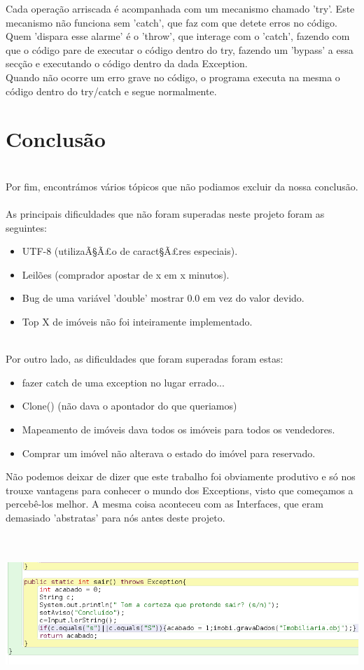 \documentclass[12pt]{article}
\begin{document}
Cada operação arriscada é acompanhada com um mecanismo chamado 'try'. Este mecanismo não funciona sem 'catch', que faz com que detete erros no código. Quem 'dispara esse alarme' é o 'throw', que interage com o 'catch', fazendo com que o código pare de executar o código dentro do try, fazendo um 'bypass' a essa secção e executando o código dentro da dada Exception. 
~\\

Quando não ocorre um erro grave no código, o programa executa na mesma o código dentro do try/catch e segue normalmente.  

\pagebreak

 
\section{Conclusão}
~\\

Por fim, encontrámos vários tópicos que não podiamos excluir da nossa conclusão.
~\\
As principais dificuldades que não foram superadas neste projeto foram as seguintes:
\begin{itemize}
\item UTF-8 (utilizaÃ§Ã£o de caract§Ã£res especiais).
\item Leilões (comprador apostar de x em x minutos).
\item Bug de uma variável 'double'  mostrar 0.0 em vez do valor devido.
\item Top X de imóveis não foi inteiramente implementado.
\end{itemize}
~\\
Por outro lado, as dificuldades que foram superadas foram estas:
\begin{itemize}
\item fazer catch de uma exception no lugar errado...
\item Clone() (não dava o apontador do que queriamos)
\item Mapeamento de imóveis dava todos os imóveis para todos os vendedores.
\item Comprar um imóvel não alterava o estado do imóvel para reservado.
\end{itemize}

Não podemos deixar de dizer que este trabalho foi obviamente produtivo e só nos trouxe vantagens para conhecer o mundo dos Exceptions, visto que começamos a percebê-los melhor. A mesma coisa aconteceu com as Interfaces, que eram demasiado 'abstratas' para nós antes deste projeto.

~\\
~\\

\includegraphics[scale=0.4]{005.png}	
\end{document}
